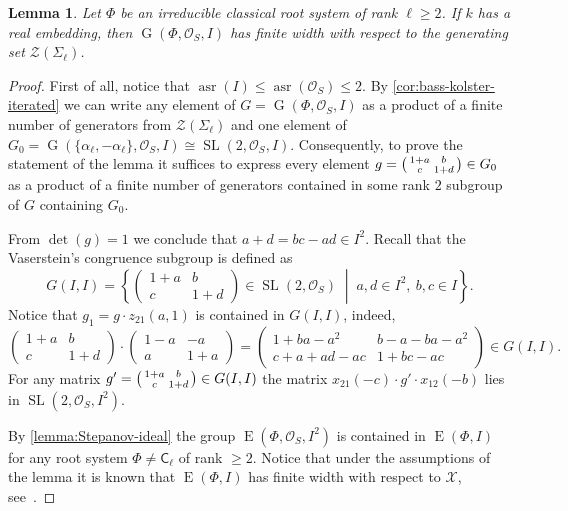 \documentclass[11pt]{amsart}
\theoremstyle{plain}
\numberwithin{equation}{section}
\newtheorem{lemma}{Lemma}
\numberwithin{lemma}{section}
\theoremstyle{definition}
\theoremstyle{remark}
\DeclareMathOperator{\G}{G}
\DeclareMathOperator{\SL}{SL}
\DeclareMathOperator{\E}{E}
\DeclareMathOperator{\asr}{asr}
\newcommand{\rC}{\mathsf{C}}
\begin{document}
\begin{lemma}\label{lemma:width-dedekind}
Let $\Phi$ be an irreducible classical root system of rank $\ell \geqslant 2$.
If $k$ has a real embedding, then $\G(\Phi, \mathcal{O}_S, I)$ has finite width with respect to the generating set $\mathcal{Z}(\Sigma_\ell)$.
\end{lemma}
\begin{proof}
First of all, notice that $\asr(I) \leqslant \asr(\mathcal{O}_S) \leqslant 2$. 
By \cref{cor:bass-kolster-iterated} we can write any element 
of $G=\G(\Phi, \mathcal{O}_S, I)$ as a product of a finite number of generators from $\mathcal{Z}(\Sigma_\ell)$ and one element of 
$G_0 = \G(\{\alpha_\ell, -\alpha_\ell\}, \mathcal{O}_S, I)\cong\SL(2, \mathcal{O}_S, I)$.
Consequently, to prove the statement of the lemma it suffices to express every element 
$g = \begin{psmallmatrix}1+a & b \\ c & 1+d \end{psmallmatrix} \in G_0$
as a product of a finite number of generators contained in some rank $2$ subgroup of $G$ containing $G_0$.

From $\det(g)=1$ we conclude that $a+d=bc-ad\in I^2$. 
Recall that the Vaserstein's congruence subgroup is defined as
\[ G(I, I)=\left\{ \begin{pmatrix}1+a & b \\ c & 1+d\end{pmatrix}\in\SL(2, \mathcal{O}_S)\;\middle|\; a, d\in I^2, \ b, c\in I \right\}. \]
Notice that $g_1=g\cdot z_{21}(a, 1)$ is contained in $G(I, I)$, indeed,
\[ \begin{pmatrix} 1+a & b \\ c & 1+d \end{pmatrix} \cdot \begin{pmatrix} 1-a & -a \\ a & 1+a \end{pmatrix} = \begin{pmatrix} 1+ba-a^2 & b-a-ba-a^2 \\ c+a+ad-ac & 1+bc-ac \end{pmatrix} \in G(I, I). \]
For any matrix $g'=\begin{psmallmatrix}1+a & b \\ c & 1+d\end{psmallmatrix}\in G(I, I)$ the matrix $x_{21}(-c)\cdot g'\cdot x_{12}(-b)$ lies in $\SL\left(2, \mathcal{O}_S, I^2\right)$.

By \cref{lemma:Stepanov-ideal} the group $\E\left(\Phi, \mathcal{O}_S, I^2\right)$ is contained in $\E(\Phi, I)$ for any root system $\Phi\neq\rC_\ell$ of rank $\geqslant2$.
Notice that under the assumptions of the lemma it is known that $\E(\Phi, I)$ has finite width with respect to $\mathcal{X}$, see~\cite[Theorem~3.3]{TavgenThesis}.


\end{proof}
\end{document}
